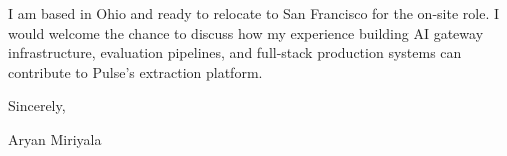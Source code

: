 \documentclass[11pt]{letter}
\begin{document}
I am based in Ohio and ready to relocate to San Francisco for the on-site role. I would welcome the chance to discuss how my experience building AI gateway infrastructure, evaluation pipelines, and full-stack production systems can contribute to Pulse's extraction platform.

Sincerely,

Aryan Miriyala
\end{document}
